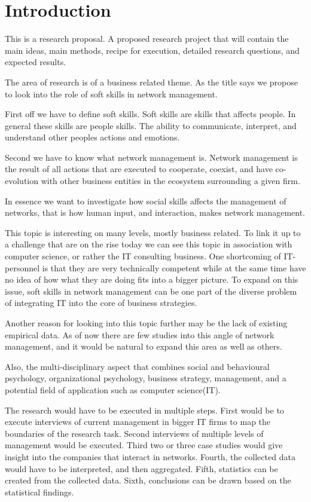\documentclass[12pt,journal,compsoc]{IEEEtran}
\begin{document}
\section{Introduction}

This is a research proposal. A proposed research project that will contain the
main ideas, main methods, recipe for execution, detailed research questions,
and expected results. 

The area of research is of a business related theme. As the title says we
propose to look into the role of soft skills in network management. 

First off we have to define soft skills. Soft skills are skills that affects
people. In general these skills are people skills. The ability to
communicate, interpret, and understand other peoples actions and emotions.

Second we have to know what network management is. Network management is the
result of all actions that are executed to cooperate, coexist, and have
co-evolution with other business entities in the ecosystem surrounding a given
firm.  

In essence we want to investigate how social skills affects the management of
networks, that is how human input, and interaction, makes network management. 

This topic is interesting on many levels, mostly business related. To link it
up to a challenge that are on the rise today we can see this topic in
association with computer science, or rather the IT consulting business. One
shortcoming of IT-personnel is that they are very technically competent while
at the same time have no idea of how what they are doing fits into a bigger
picture. To expand on this issue, soft skills in network management can be one
part of the diverse problem of integrating IT into the core of business
strategies. 

Another reason for looking into this topic further may be the lack of existing
empirical data. As of now there are few studies into this angle of network
management, and it would be natural to expand this area as well as others. 

Also, the multi-disciplinary aspect that combines social and behavioural psychology,
organizational psychology, business strategy, management, and a potential field
of application such as computer science(IT). 

The research would have to be executed in multiple steps. 
First would be to
execute interviews of current management in bigger IT firms to map the
boundaries of the research task. Second interviews of multiple levels of
management would be executed. Third two or three case studies would give
insight into the companies that interact in networks. Fourth, the collected data
would have to be interpreted, and then aggregated. Fifth, statistics can be
created from the collected data. Sixth, conclusions can be drawn based on the
statistical findings. 
\end{document}
